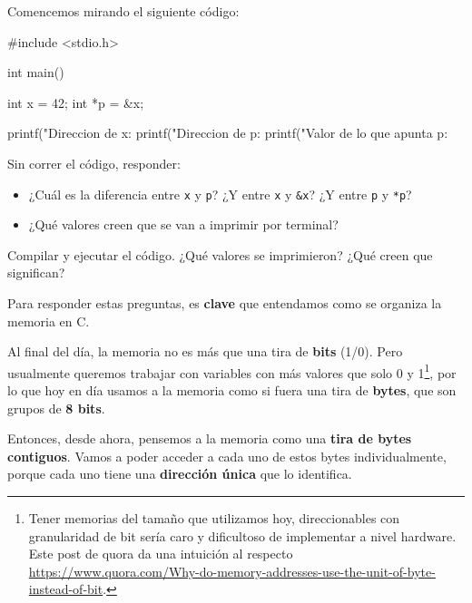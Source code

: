 \documentclass[]{scrartcl}
\begin{document}
Comencemos mirando el siguiente código:

\begin{cbox}[unbreakable,label=sni:xp,nameref={Snippet \ref{sni:xp}}]{}
  #include <stdio.h>

  int main(){
      int x = 42;
      int *p = &x;
  
      printf("Direccion de x:  %
      printf("Direccion de p: %
      printf("Valor de lo que apunta p: %
  }
\end{cbox}

\begin{exbox}[label=ejercicio1]
  Sin correr el código, responder:
  \begin{itemize}
    \item ¿Cuál es la diferencia entre \texttt{x} y \texttt{p}? ¿Y entre \texttt{x} y \texttt{\&x}? ¿Y entre \texttt{p} y \texttt{*p}?
    \item ¿Qué valores creen que se van a imprimir por terminal?
  \end{itemize}
\end{exbox}

\begin{exbox}[label=ejercicio2]
  Compilar y ejecutar el código. 
  ¿Qué valores se imprimieron?
  ¿Qué creen que significan?
\end{exbox}

Para responder estas preguntas, es \textbf{clave} que entendamos como se organiza la memoria en C.

Al final del día, la memoria no es más que una tira de \textbf{bits} (1/0).
Pero usualmente queremos trabajar con variables con más valores que solo 0 y 1\footnote{Tener memorias del tamaño que utilizamos hoy, direccionables con granularidad de bit sería caro y dificultoso de implementar a nivel hardware. Este post de quora da una intuición al respecto \url{https://www.quora.com/Why-do-memory-addresses-use-the-unit-of-byte-instead-of-bit}.}, por lo que hoy en día usamos a la memoria como si fuera una tira de \textbf{bytes}, que son grupos de \textbf{8 bits}.

Entonces, desde ahora, pensemos a la memoria como una \textbf{tira de bytes contiguos}.
Vamos a poder acceder a cada uno de estos bytes individualmente, porque cada uno tiene una \textbf{dirección única} que lo identifica.
\end{document}
